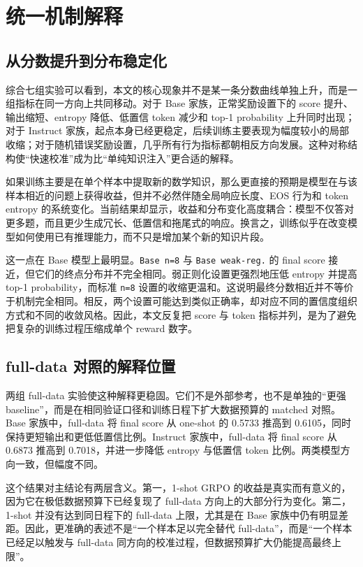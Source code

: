 \documentclass[12pt,a4paper]{ctexart}
\begin{document}
\section{统一机制解释}

\subsection{从分数提升到分布稳定化}

综合七组实验可以看到，本文的核心现象并不是某一条分数曲线单独上升，而是一组指标在同一方向上共同移动。对于 Base 家族，正常奖励设置下的 score 提升、输出缩短、entropy 降低、低置信 token 减少和 top-1 probability 上升同时出现；对于 Instruct 家族，起点本身已经更稳定，后续训练主要表现为幅度较小的局部收缩；对于随机错误奖励设置，几乎所有行为指标都朝相反方向发展。这种对称结构使“快速校准”成为比“单纯知识注入”更合适的解释。

如果训练主要是在单个样本中提取新的数学知识，那么更直接的预期是模型在与该样本相近的问题上获得收益，但并不必然伴随全局响应长度、EOS 行为和 token entropy 的系统变化。当前结果却显示，收益和分布变化高度耦合：模型不仅答对更多题，而且更少生成冗长、低置信和拖尾式的响应。换言之，训练似乎在改变模型如何使用已有推理能力，而不只是增加某个新的知识片段。

这一点在 Base 模型上最明显。\texttt{Base n=8} 与 \texttt{Base weak-reg.} 的 final score 接近，但它们的终点分布并不完全相同。弱正则化设置更强烈地压低 entropy 并提高 top-1 probability，而标准 \texttt{n=8} 设置的收缩更温和。这说明最终分数相近并不等价于机制完全相同。相反，两个设置可能达到类似正确率，却对应不同的置信度组织方式和不同的收敛风格。因此，本文反复把 score 与 token 指标并列，是为了避免把复杂的训练过程压缩成单个 reward 数字。

\subsection{full-data 对照的解释位置}

两组 full-data 实验使这种解释更稳固。它们不是外部参考，也不是单独的“更强 baseline”，而是在相同验证口径和训练日程下扩大数据预算的 matched 对照。Base 家族中，full-data 将 final score 从 one-shot 的 0.5733 推高到 0.6105，同时保持更短输出和更低低置信比例。Instruct 家族中，full-data 将 final score 从 0.6873 推高到 0.7018，并进一步降低 entropy 与低置信 token 比例。两类模型方向一致，但幅度不同。

这个结果对主结论有两层含义。第一，1-shot GRPO 的收益是真实而有意义的，因为它在极低数据预算下已经复现了 full-data 方向上的大部分行为变化。第二，1-shot 并没有达到同日程下的 full-data 上限，尤其是在 Base 家族中仍有明显差距。因此，更准确的表述不是“一个样本足以完全替代 full-data”，而是“一个样本已经足以触发与 full-data 同方向的校准过程，但数据预算扩大仍能提高最终上限”。
\end{document}
